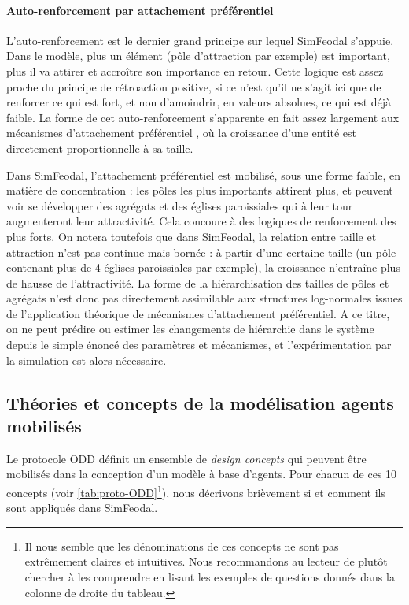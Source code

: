 \paragraph{Auto-renforcement par attachement préférentiel}
L'auto-renforcement est le dernier grand principe sur lequel SimFeodal s'appuie.
Dans le modèle, plus un élément (pôle d'attraction par exemple) est important, plus il va attirer et accroître son importance en retour.
Cette logique est assez proche du principe de rétroaction positive, si ce n'est qu'il ne s'agit ici que de renforcer ce qui est fort, et non d'amoindrir, en valeurs absolues, ce qui est déjà faible.
La forme de cet auto-renforcement s'apparente en fait assez largement aux mécanismes d'attachement préférentiel \autocite{barabasi_emergence_1999}, où la croissance d'une entité est directement proportionnelle à sa taille.

Dans SimFeodal, l'attachement préférentiel est mobilisé, sous une forme faible, en matière de concentration : les pôles les plus importants attirent plus, et peuvent voir se développer des agrégats et des églises paroissiales qui à leur tour augmenteront leur attractivité.
Cela concoure à des logiques de renforcement des plus forts.
On notera toutefois que dans SimFeodal, la relation entre taille et attraction n'est pas continue mais bornée : à partir d'une certaine taille (un pôle contenant plus de 4 églises paroissiales par exemple), la croissance n'entraîne plus de hausse de l'attractivité.
La forme de la hiérarchisation des tailles de pôles et agrégats n'est donc pas directement assimilable aux structures log-normales issues de l'application théorique de mécanismes d'attachement préférentiel.
A ce titre, on ne peut prédire ou estimer les changements de hiérarchie dans le système depuis le simple énoncé des paramètres et mécanismes, et l'expérimentation par la simulation est alors nécessaire.

\clearpage
\subsection{Théories et concepts de la modélisation agents mobilisés}

Le protocole ODD définit un ensemble de \textit{design concepts} qui peuvent être mobilisés dans la conception d'un modèle à base d'agents.
Pour chacun de ces 10 concepts (voir \cref{tab:proto-ODD}\footnote{
Il nous semble que les dénominations de ces concepts ne sont pas extrêmement claires et intuitives.
Nous recommandons au lecteur de plutôt chercher à les comprendre en lisant les exemples de questions donnés dans la colonne de droite du tableau.
}), nous décrivons brièvement si et comment ils sont appliqués dans SimFeodal.

